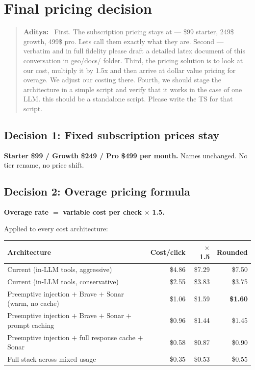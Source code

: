 \documentclass[11pt,letterpaper]{article}
\newenvironment{userturn}
  {\begin{quote}\small\color{brand}\textbf{Aditya:}~}
  {\end{quote}}
\begin{document}
\section{Final pricing decision}

\begin{userturn}
First. The subscription pricing stays at --- \$99 starter, 249\$ growth,
499\$ pro. Lets call them exactly what they are. Second --- verbatim and in
full fidelity please draft a detailed latex document of this conversation in
geo/docs/ folder. Third, the pricing solution is to look at our cost,
multiply it by 1.5x and then arrive at dollar value pricing for overage. We
adjust our costing there. Fourth, we should stage the architecture in a
simple script and verify that it works in the case of one LLM. this should
be a standalone script. Please write the TS for that script.
\end{userturn}

\subsection{Decision 1: Fixed subscription prices stay}

\textbf{Starter \$99 / Growth \$249 / Pro \$499 per month.} Names unchanged.
No tier rename, no price shift.

\subsection{Decision 2: Overage pricing formula}

\textbf{Overage rate $=$ variable cost per check $\times$ 1.5.}

Applied to every cost architecture:

\begin{center}
\begin{tabular}{@{}lrrr@{}}
\toprule
\textbf{Architecture} & \textbf{Cost/click} & \textbf{$\times$ 1.5} & \textbf{Rounded} \\
\midrule
Current (in-LLM tools, aggressive)                               & \$4.86 & \$7.29 & \$7.50 \\
Current (in-LLM tools, conservative)                             & \$2.55 & \$3.83 & \$3.75 \\
Preemptive injection $+$ Brave $+$ Sonar (warm, no cache)        & \$1.06 & \$1.59 & \textbf{\$1.60} \\
Preemptive injection $+$ Brave $+$ Sonar $+$ prompt caching      & \$0.96 & \$1.44 & \$1.45 \\
Preemptive injection $+$ full response cache $+$ Sonar           & \$0.58 & \$0.87 & \$0.90 \\
Full stack across mixed usage                                    & \$0.35 & \$0.53 & \$0.55 \\
\bottomrule
\end{tabular}
\end{center}
\end{document}
